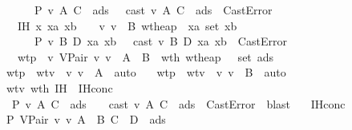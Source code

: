\begin{isabellebody}
\ \ \ \ \ \ \ \ {\isacharparenleft}{\isacharquery}P\ v{}\ A\ C\ {\isasymmu}\ ads{}\ {\isasymSigma}{\isacharparenright}\ {\isasymor}\ {\isacharparenleft}cast\ v{}\ A\ C\ {\isasymmu}\ ads{}\ {\isacharequal}\ CastError{\isacharparenright}{\isachardoublequoteclose}\isanewline
\ \ \ \ \ IH{}{\isacharcolon}\ {\isachardoublequoteopen}{\isasymAnd}x\ xa\ xb\ {\isasymSigma}{\isachardot}\ {\isasymlbrakk}\ {\isasymSigma}\ {\isasymturnstile}v\ v{}\ {\isacharcolon}\ B{\isacharsemicolon}\ wt{\isacharunderscore}heap\ {\isasymSigma}\ xa\ {\isacharparenleft}set\ xb{\isacharparenright}{\isasymrbrakk}\ {\isasymLongrightarrow}\isanewline
\ \ \ \ \ \ \ \ {\isacharparenleft}{\isacharquery}P\ v{}\ B\ D\ xa\ xb\ {\isasymSigma}{\isacharparenright}\ {\isasymor}\ {\isacharparenleft}cast\ v{}\ B\ D\ xa\ xb\ {\isacharequal}\ CastError{\isacharparenright}{\isachardoublequoteclose}\isanewline
\ \ \ \ \ wtp{\isacharcolon}\ {\isachardoublequoteopen}{\isasymSigma}\ {\isasymturnstile}v\ VPair\ v{}\ v{}\ {\isacharcolon}\ A\ {\isasymtimes}\ B{\isachardoublequoteclose}\ \ wth{\isacharcolon}\ {\isachardoublequoteopen}wt{\isacharunderscore}heap\ {\isasymSigma}\ {\isasymmu}\ {\isacharparenleft}set\ ads{}{\isacharparenright}{\isachardoublequoteclose}\isanewline
\ \ \isamarkupfalse \ wtp\ \isamarkupfalse \ wtv{}{\isacharcolon}\ {\isachardoublequoteopen}{\isasymSigma}\ {\isasymturnstile}v\ v{}\ {\isacharcolon}\ A{\isachardoublequoteclose}\ \isamarkupfalse \ auto\isanewline
\ \ \isamarkupfalse \ wtp\ \isamarkupfalse \ wtv{}{\isacharcolon}\ {\isachardoublequoteopen}{\isasymSigma}\ {\isasymturnstile}v\ v{}\ {\isacharcolon}\ B{\isachardoublequoteclose}\ \isamarkupfalse \ auto\isanewline
\ \ \isamarkupfalse \ wtv{}\ wth\ IH{}\ \isamarkupfalse \ IH{}conc{\isacharcolon}\isanewline
\ \ \ \ {\isachardoublequoteopen}{\isacharquery}P\ v{}\ A\ C\ {\isasymmu}\ ads{}\ {\isasymSigma}\ \ {\isasymor}\ {\isacharparenleft}cast\ v{}\ A\ C\ {\isasymmu}\ ads{}\ {\isacharequal}\ CastError{\isacharparenright}{\isachardoublequoteclose}\ \isamarkupfalse \ blast\isanewline
\ \ \isamarkupfalse \ IH{}conc\isanewline
\ \ \isamarkupfalse \ {\isachardoublequoteopen}{\isacharparenleft}{\isacharquery}P\ {\isacharparenleft}VPair\ v{}\ v{}{\isacharparenright}\ {\isacharparenleft}A\ {\isasymtimes}\ B{\isacharparenright}\ {\isacharparenleft}C\ {\isasymtimes}\ D{\isacharparenright}\ {\isasymmu}\ ads{}\ {\isasymSigma}{\isacharparenright}\ \isanewline

\end{isabellebody}
